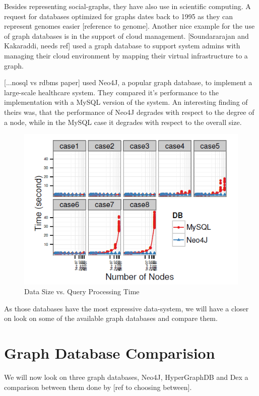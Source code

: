 \documentclass{acm_proc_article-sp}
\begin{document}
Besides representing social-graphs, they have also use in scientific computing. A request for databases optimized for graphs dates back to 1995 as they can represent genomes easier [reference to genome]. Another nice example for the use of graph databases is in the support of cloud management. [Soundararajan and Kakaraddi, needs ref] used a graph database to support system admins with managing their cloud environment by mapping their virtual infrastructure to a graph.

[...nosql vs rdbms paper] used Neo4J, a popular graph database, to implement a large-scale healthcare system. They compared it's performance to the implementation with a MySQL version of the system. An interesting finding of theirs was, that the performance of Neo4J degrades with respect to the degree of a node, while in the MySQL case it degrades with respect to the overall size.

\begin{figure}[hbtp]
	\centering
	\includegraphics[scale=0.5]{neo4j_mysql.png}
	\caption{Data Size vs. Query Processing Time}
\end{figure}

As those databases have the most expressive data-system, we will have a closer on look on some of the available graph databases and compare them.

\section{Graph Database Comparision}

We will now look on three graph databases, Neo4J, HyperGraphDB and Dex a comparison between them done by [ref to choosing between].
\end{document}
